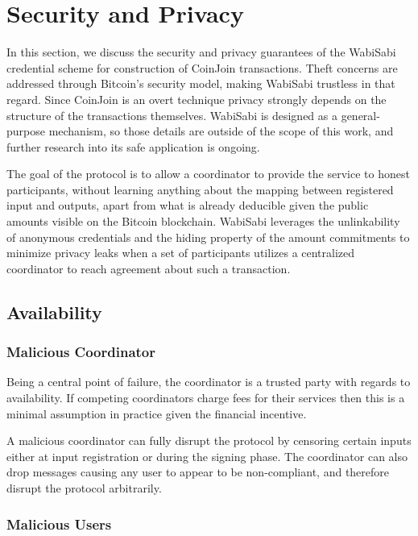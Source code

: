 \documentclass[a4paper]{article}
\begin{document}
\section{Security and Privacy} \label{sec:securitayandprivacy}

In this section, we discuss the security and privacy guarantees of the WabiSabi credential scheme for construction of CoinJoin transactions. Theft concerns are addressed through Bitcoin's security model, making WabiSabi trustless in that regard. Since CoinJoin is an overt technique privacy strongly depends on the structure of the transactions themselves. WabiSabi is designed as a general-purpose mechanism, so those details are outside of the scope of this work, and further research into its safe application is ongoing.

The goal of the protocol is to allow a coordinator to provide the service to honest participants, without learning anything about the mapping between registered input and outputs, apart from what is already deducible given the public amounts visible on the Bitcoin blockchain. WabiSabi leverages the unlinkability of anonymous credentials and the hiding property of the amount commitments to minimize privacy leaks when a set of participants utilizes a centralized coordinator to reach agreement about such a transaction.

\subsection{Availability}

\subsubsection{Malicious Coordinator}

Being a central point of failure, the coordinator is a trusted party with regards to availability. If competing coordinators charge fees for their services then this is a minimal assumption in practice given the financial incentive.

A malicious coordinator can fully disrupt the protocol by censoring certain inputs either at input registration or during the signing phase. The coordinator can also drop messages causing any user to appear to be non-compliant, and therefore disrupt the protocol arbitrarily.

\subsubsection{Malicious Users}
\end{document}
